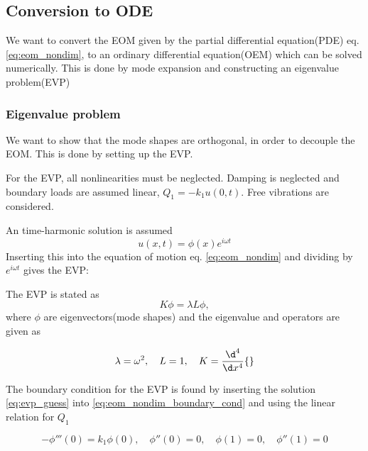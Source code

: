 \subsection{Conversion to ODE}
\label{sec:ode}

We want to convert the EOM given by the partial differential equation(PDE) eq.
\eqref{eq:eom_nondim}, to an ordinary differential equation(OEM) which can be
solved numerically. This is done by mode expansion and constructing an
eigenvalue problem(EVP)

\subsubsection{Eigenvalue problem}
\label{sec:evp}

We want to show that the mode shapes are orthogonal, in order to decouple the
EOM. This is done by setting up the EVP.


For the EVP, all nonlinearities must be neglected. Damping is neglected and
boundary loads are assumed linear, $Q_1 = -k_1 u(0, t)$. Free vibrations are
considered.

An time-harmonic solution is assumed
\begin{equation}
u(x,t) = \phi(x) e^{i\omega t}
\label{eq:evp_guess}
\end{equation}
Inserting this into the equation of motion eq. \eqref{eq:eom_nondim} and
dividing by $e^{i\omega t}$ gives the EVP:

The EVP is stated as
\begin{equation}
  \label{eq:evp}
  K \phi = \lambda L \phi,
\end{equation}
where $\phi$ are eigenvectors(mode shapes) and the eigenvalue and operators are
given as

\begin{equation}
  \label{eq:evp_operator}
  \lambda = \omega^2,
  \quad L = 1,
  \quad K = \frac{\d^{4}}{\d x^{4}}\{\}
\end{equation}

The boundary condition for the EVP is found by inserting the solution
\eqref{eq:evp_guess} into \eqref{eq:eom_nondim_boundary_cond} and using the
linear relation for $Q_1$

\begin{equation}
  -\phi'''(0) = k_1\phi(0), \quad
  \phi''(0) = 0, \quad
  \phi(1) = 0, \quad
  \phi''(1)  = 0
\label{eq:evp_boundary_cond}
\end{equation}

